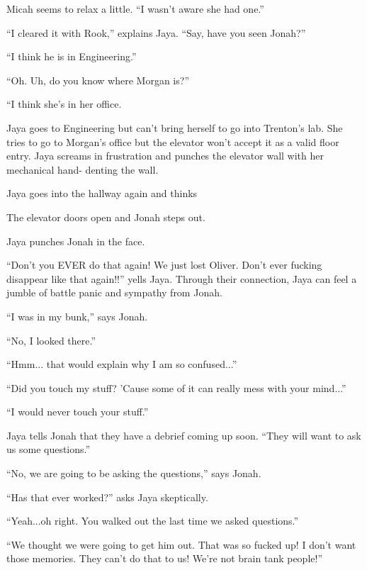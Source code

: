 Micah seems to relax a little. ``I wasn't aware she had one.''

``I cleared it with Rook,'' explains Jaya.  ``Say, have you seen Jonah?''

``I think he is in Engineering.''

``Oh.  Uh, do you know where Morgan is?''

``I think she's in her office.



Jaya goes to Engineering but can't bring herself to go into Trenton's lab.  She tries to go to Morgan's office but the elevator won't accept it as a valid floor entry.  Jaya screams in frustration and punches the elevator wall with her mechanical hand- denting the wall.





Jaya goes into the hallway again and thinks  

The elevator doors open and Jonah steps out.

Jaya punches Jonah in the face.

``Don't you EVER do that again!  We just lost Oliver.  Don't ever fucking disappear like that again!!'' yells Jaya.  Through their connection, Jaya can feel a jumble of battle panic and sympathy from Jonah.

``I was in my bunk,'' says Jonah.

``No, I looked there.''

``Hmm... that would explain why I am so confused...''

``Did you touch my stuff?  'Cause some of it can really mess with your mind...''

``I would never touch your stuff.''



Jaya tells Jonah that they have a debrief coming up soon.  ``They will want to ask us some questions.''

``No, we are going to be asking the questions,'' says Jonah.

``Has that ever worked?'' asks Jaya skeptically.

``Yeah...oh right.  You walked out the last time we asked questions.''

``We thought we were going to get him out.  That was so fucked up!  I don't want those memories.  They can't do that to us!  We're not brain tank people!''



